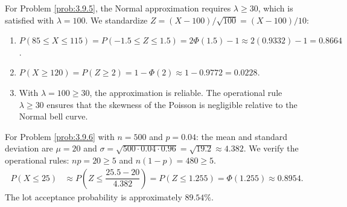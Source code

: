 \begin{solucion}
	\label{sol:3.9.5}
	For Problem \ref{prob:3.9.5}, the Normal approximation requires $\lambda \ge 30$, which is satisfied with $\lambda = 100$. We standardize $Z = (X - 100)/\sqrt{100} = (X - 100)/10$:
	\begin{enumerate}
		\item $P(85 \le X \le 115) = P(-1.5 \le Z \le 1.5) = 2\Phi(1.5) - 1 \approx 2(0.9332) - 1 = 0.8664$.
		\item $P(X \ge 120) = P(Z \ge 2) = 1 - \Phi(2) \approx 1 - 0.9772 = 0.0228$.
		\item With $\lambda = 100 \ge 30$, the approximation is reliable. The operational rule $\lambda \ge 30$ ensures that the skewness of the Poisson is negligible relative to the Normal bell curve.
	\end{enumerate}
\end{solucion}

\begin{solucion}
	\label{sol:3.9.6}
	For Problem \ref{prob:3.9.6} with $n = 500$ and $p = 0.04$: the mean and standard deviation are $\mu = 20$ and $\sigma = \sqrt{500 \cdot 0.04 \cdot 0.96} = \sqrt{19.2} \approx 4.382$. We verify the operational rules: $np = 20 \ge 5$ and $n(1-p) = 480 \ge 5$.
	\begin{align*}
		P(X \le 25) &\approx P\left(Z \le \dfrac{25.5 - 20}{4.382}\right) = P(Z \le 1.255) = \Phi(1.255) \approx 0.8954.
	\end{align*}
	The lot acceptance probability is approximately $89.54\%$.
\end{solucion}

